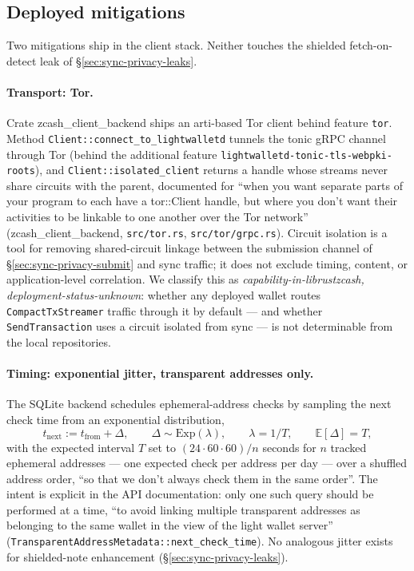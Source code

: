 \documentclass[11pt,a4paper]{article}
\theoremstyle{definition}
\newcommand{\E}{\mathbb{E}}
\begin{document}
\subsection{Deployed mitigations}\label{sec:sync-privacy-mitigations}

Two mitigations ship in the client stack. Neither touches the shielded
fetch-on-detect leak of \S\ref{sec:sync-privacy-leaks}.

\paragraph{Transport: Tor.} Crate \textsf{zcash\_client\_backend} ships an
arti-based Tor client behind feature \texttt{tor}. Method
\texttt{Client::connect\_to\_lightwalletd} tunnels the tonic gRPC channel
through Tor (behind the additional feature
\texttt{lightwalletd-tonic-tls-webpki-roots}), and
\texttt{Client::isolated\_client} returns a handle
whose streams never share circuits with the parent, documented for ``when
you want separate parts of your program to each have a tor::Client handle,
but where you don't want their activities to be linkable to one another
over the Tor network'' (\textsf{zcash\_client\_backend},
\texttt{src/tor.rs}, \texttt{src/tor/grpc.rs}). Circuit isolation is
a tool for removing shared-circuit linkage between the submission channel
of \S\ref{sec:sync-privacy-submit} and sync traffic; it does not exclude
timing, content, or application-level correlation. We classify this as
\emph{capability-in-librustzcash, deployment-status-unknown}: whether any
deployed wallet routes \texttt{CompactTxStreamer} traffic through it by
default --- and whether \texttt{SendTransaction} uses a circuit isolated
from sync --- is not determinable from the local repositories.

\paragraph{Timing: exponential jitter, transparent addresses only.} The
SQLite backend schedules ephemeral-address checks by sampling the next
check time from an exponential distribution,
\[
  t_{\mathrm{next}} := t_{\mathrm{from}} + \Delta, \qquad
  \Delta \sim \mathrm{Exp}(\lambda), \qquad
  \lambda = 1/T, \qquad
  \E[\Delta] = T,
\]
with the expected interval $T$ set to $(24 \cdot 60 \cdot 60)/n$ seconds
for $n$ tracked ephemeral addresses --- one expected check per address per
day --- over a shuffled address order, ``so that we don't always check them
in the same order''. The intent is explicit in
the API documentation: only one such query should be performed at a time,
``to avoid linking multiple transparent addresses as belonging to the same
wallet in the view of the light wallet server''
(\texttt{TransparentAddressMetadata::next\_check\_time}). No analogous
jitter exists for shielded-note enhancement
(\S\ref{sec:sync-privacy-leaks}).
\end{document}
